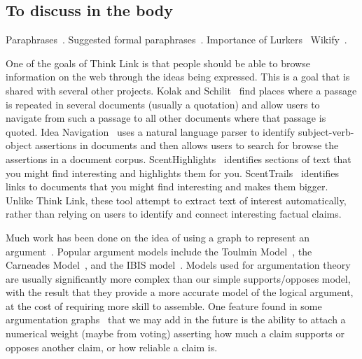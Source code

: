 \documentclass{chi2009}
\begin{document}
% 
% 

% 

% 

\subsection{To discuss in the body}

Paraphrases~\cite{Chklovski2005}. Suggested formal paraphrases~\cite{Blythe2004}.
Importance of Lurkers~\cite{Takahashi2003}
Wikify~\cite{Mihalcea2007}.


One of the goals of Think Link is that people should be able to browse information on the web through the ideas being expressed. This is a goal that is shared with several other projects. Kolak and Schilit~\cite{quotations} find places where a passage is repeated in several documents (usually a quotation) and allow users to navigate from such a passage to all other documents where that passage is quoted. Idea Navigation~\cite{ideanavigation} uses a natural language parser to identify subject-verb-object assertions in documents and then allows users to search for browse the assertions in a document corpus. ScentHighlights~\cite{Chi2005} identifies sections of text that you might find interesting and highlights them for you. ScentTrails~\cite{Olston2003} identifies links to documents that you might find interesting and makes them bigger. Unlike Think Link, these tool attempt to extract text of interest automatically, rather than relying on users to identify and connect interesting factual claims.

Much work has been done on the idea of using a graph to represent an argument~\cite{argumentation,argmas}. Popular argument models include the Toulmin Model~\cite{toulmin}, the Carneades Model~\cite{carneades}, and the IBIS model~\cite{ibis}. Models used for argumentation theory are usually significantly more complex than our simple supports/opposes model, with the result that they provide a more accurate model of the logical argument, at the cost of requiring more skill to assemble. One feature found in some argumentation graphs~\cite{Korb97acognitive} that we may add in the future is the ability to attach a numerical weight (maybe from voting) asserting how much a claim supports or opposes another claim, or how reliable a claim is.
\end{document}
